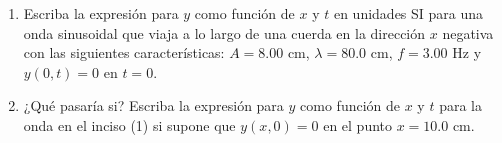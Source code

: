 \item \begin{enumerate}
    \item Escriba la expresión para $y$ como función de $x$ y $t$ en unidades SI para una onda sinusoidal que viaja a lo largo de una cuerda en la dirección $x$ negativa con las siguientes características: $A = 8.00\text{ cm}$, $\lambda = 80.0\text{ cm}$, $f = 3.00\text{ Hz}$ y $y(0,t) = 0$ en $t = 0$.
    \item ¿Qué pasaría si? Escriba la expresión para $y$ como función de $x$ y $t$ para la onda en el inciso (1) si supone que $y(x,0) = 0$ en el punto $x = 10.0\text{ cm}$.
\end{enumerate}